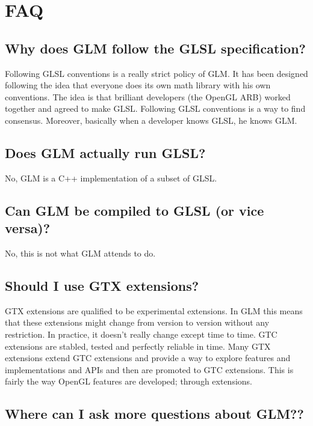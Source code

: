 \documentclass{scrartcl}
\numberwithin{figure}{subsection}
\begin{document}
\newpage{}

\section{FAQ}

\subsection{Why does GLM follow the GLSL specification?}

Following GLSL conventions is a really strict policy of GLM. It has been designed following the idea that everyone does its own math library with his own conventions. The idea is that brilliant developers (the OpenGL ARB) worked together and agreed to make GLSL. Following GLSL conventions is a way to find consensus. Moreover, basically when a developer knows GLSL, he knows GLM.

\subsection{Does GLM actually run GLSL?}

No, GLM is a C++ implementation of a subset of GLSL.

\subsection{Can GLM be compiled to GLSL (or vice versa)?}

No, this is not what GLM attends to do.

\subsection{Should I use GTX extensions?}

GTX extensions are qualified to be experimental extensions.  In GLM this means that these extensions might change from version to version without any restriction. In practice, it doesn't really change except time to time. GTC extensions are stabled, tested and perfectly reliable in time. Many GTX extensions extend GTC extensions and provide a way to explore features and implementations and APIs and then are promoted to GTC extensions. This is fairly the way OpenGL features are developed; through extensions.

\subsection{Where can I ask more questions about GLM??}
\end{document}

